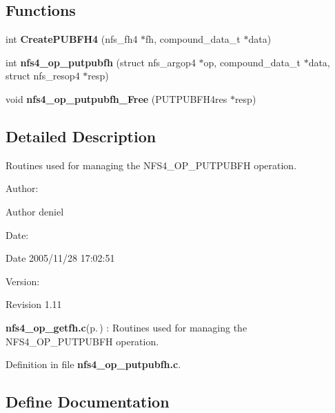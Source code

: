 \subsection*{Functions}
\begin{CompactItemize}
\item 
int {\bf Create\-PUBFH4} (nfs\_\-fh4 $\ast$fh, compound\_\-data\_\-t $\ast$data)
\item 
int {\bf nfs4\_\-op\_\-putpubfh} (struct nfs\_\-argop4 $\ast$op, compound\_\-data\_\-t $\ast$data, struct nfs\_\-resop4 $\ast$resp)
\item 
void {\bf nfs4\_\-op\_\-putpubfh\_\-Free} (PUTPUBFH4res $\ast$resp)
\end{CompactItemize}


\subsection{Detailed Description}
Routines used for managing the NFS4\_\-OP\_\-PUTPUBFH operation. 

\begin{Desc}
\item[Author:]\begin{Desc}
\item[Author]deniel \end{Desc}
\end{Desc}
\begin{Desc}
\item[Date:]\begin{Desc}
\item[Date]2005/11/28 17:02:51 \end{Desc}
\end{Desc}
\begin{Desc}
\item[Version:]\begin{Desc}
\item[Revision]1.11 \end{Desc}
\end{Desc}
{\bf nfs4\_\-op\_\-getfh.c}{\rm (p.\,\pageref{nfs4__op__getfh_8c})} : Routines used for managing the NFS4\_\-OP\_\-PUTPUBFH operation.

Definition in file {\bf nfs4\_\-op\_\-putpubfh.c}.

\subsection{Define Documentation}
